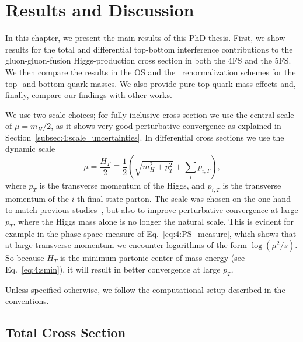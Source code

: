 
\chapter{Results and Discussion}\label{chap:six}

In this chapter, we present the main results of this PhD thesis. First, we show results for the total and differential top-bottom interference contributions to the gluon-gluon-fusion Higgs-production cross section in both the 4\acs{FS} and the 5\acs{FS}. We then compare the results in the \acs{OS} and the \MS\ renormalization schemes for the top- and bottom-quark masses. We also provide pure-top-quark-mass effects and, finally, compare our findings with other works.

We use two scale choices; for fully-inclusive cross section we use the central scale of $\mu = m_H/2$, as it shows very good perturbative convergence as explained in Section~\ref{subsec:4:scale_uncertainties}. In differential cross sections we use the dynamic scale
\begin{equation}
\mu = \frac{H_T}{2} \equiv \frac{1}{2} \left( \sqrt{m_H^2 + p_T^2} + \sum_i p_{i, T} \right),
\label{eq:6:mu_dynamic}
\end{equation}
where $p_T$ is the transverse momentum of the Higgs, and $p_{i, T}$ is the transverse momentum of the $i$-th final state parton. The scale was chosen on the one hand to match previous studies~\cite{Lindert:2017pky, Bonciani:2022jmb, Jones:2018hbb}, but also to improve perturbative convergence at large $p_T$, where the Higgs mass alone is no longer the natural scale. This is evident for example in the phase-space measure of Eq.~\eqref{eq:4:PS_measure}, which shows that at large transverse momentum we encounter logarithms of the form $\log (\mu^2/s)$. So because $H_T$ is the minimum partonic center-of-mass energy (see Eq.~\eqref{eq:4:smin}), it will result in better convergence at large $p_T$.

Unless specified otherwise, we follow the computational setup described in the \hyperref[chap:notation_and_conventions]{conventions}.
\section{Total Cross Section}
